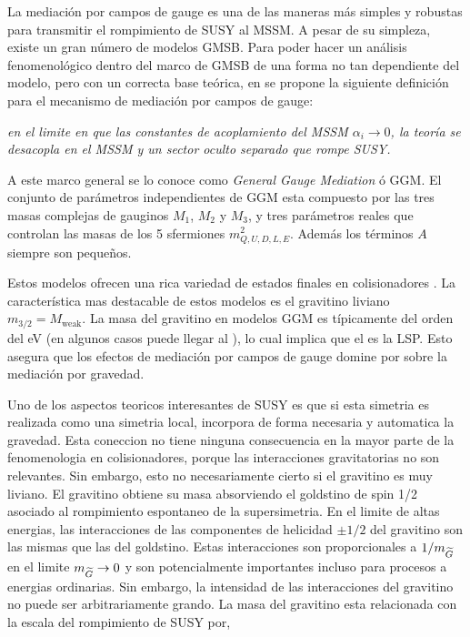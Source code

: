 
La mediación por campos de gauge es una de las maneras más simples y
robustas para transmitir el rompimiento de SUSY al MSSM. A pesar de su
simpleza, existe un gran número de modelos GMSB. Para poder hacer un
análisis fenomenológico dentro del marco de GMSB de una forma no tan
dependiente del modelo, pero con un correcta base teórica, en
\cite{GGM} se propone la siguiente definición para el mecanismo de
mediación por campos de gauge:

\emph{en el limite en que las constantes de acoplamiento del MSSM
  $\alpha_i \to 0$, la teoría se desacopla en el MSSM y un sector
  oculto separado que rompe SUSY.}

A este marco general se lo conoce como \emph{General Gauge Mediation}
ó GGM. El conjunto de parámetros independientes de GGM esta compuesto
por las tres masas complejas de gauginos $M_1$, $M_2$ y $M_3$, y tres
parámetros reales que controlan las masas de los 5 sfermiones
$m^2_{Q,U,D,L,E}$. Además los términos $A$ siempre son pequeños.

Estos modelos ofrecen una rica variedad de estados finales en
colisionadores \cite{0911.4130}. La característica mas destacable de
estos modelos es el gravitino liviano $m_{3/2} = M_\text{weak}$. La
masa del gravitino en modelos GGM es típicamente del orden del eV (en
algunos casos puede llegar al \gev), lo cual implica que el {\gravino}
es la LSP. Esto asegura que los efectos de mediación por campos de
gauge domine por sobre la mediación por gravedad.



Uno de los aspectos teoricos interesantes de SUSY es que si esta
simetria es realizada como una simetria local, incorpora de forma
necesaria y automatica la gravedad. Esta coneccion no tiene ninguna
consecuencia en la mayor parte de la fenomenologia en colisionadores,
porque las interacciones gravitatorias no son relevantes. Sin embargo,
esto no necesariamente cierto si el gravitino es muy liviano. El
gravitino obtiene su masa absorviendo el goldstino de spin 1/2
asociado al rompimiento espontaneo de la supersimetria. En el limite
de altas energias, las interacciones de las componentes de helicidad
$\pm 1/2$ del gravitino son las mismas que las del goldstino. Estas
interacciones son proporcionales a $1/m_{\widetilde{G}}$ en el limite
$m_{\widetilde{G}} \rightarrow 0$ y son potencialmente importantes incluso para
procesos a energias ordinarias. Sin embargo, la intensidad de las
interacciones del gravitino no puede ser arbitrariamente grando. La
masa del gravitino esta relacionada con la escala del rompimiento de
SUSY por,

